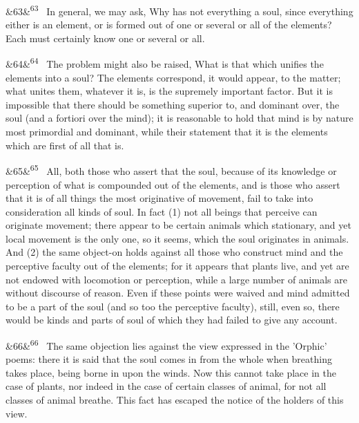 \documentclass[12pt]{article}
\newcommand{\para}[1][]{\par\noindent\ifx&#1&\else\textsuperscript{\footnotesize #1}~\fi}
\begin{document}
\para[63] In general, we may ask, Why has not everything a soul, since everything either is an element, or is formed out of one or several or all of the elements? Each must certainly know one or several or all.

\para[64] The problem might also be raised, What is that which unifies the elements into a soul? The elements correspond, it would appear, to the matter; what unites them, whatever it is, is the supremely important factor. But it is impossible that there should be something superior to, and dominant over, the soul (and a fortiori over the mind); it is reasonable to hold that mind is by nature most primordial and dominant, while their statement that it is the elements which are first of all that is.

\para[65] All, both those who assert that the soul, because of its knowledge or perception of what is compounded out of the elements, and is those who assert that it is of all things the most originative of movement, fail to take into consideration all kinds of soul. In fact (1) not all beings that perceive can originate movement; there appear to be certain animals which stationary, and yet local movement is the only one, so it seems, which the soul originates in animals. And (2) the same object-on holds against all those who construct mind and the perceptive faculty out of the elements; for it appears that plants live, and yet are not endowed with locomotion or perception, while a large number of animals are without discourse of reason. Even if these points were waived and mind admitted to be a part of the soul (and so too the perceptive faculty), still, even so, there would be kinds and parts of soul of which they had failed to give any account.

\para[66] The same objection lies against the view expressed in the 'Orphic' poems: there it is said that the soul comes in from the whole when breathing takes place, being borne in upon the winds. Now this cannot take place in the case of plants, nor indeed in the case of certain classes of animal, for not all classes of animal breathe. This fact has escaped the notice of the holders of this view.
\end{document}
